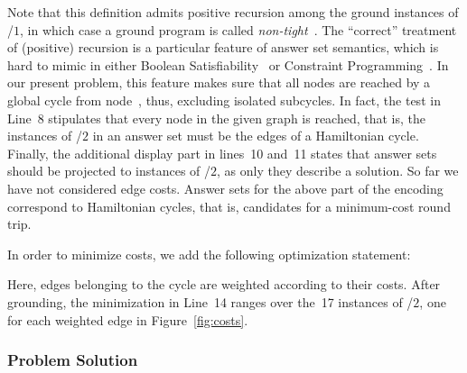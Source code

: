 Note that this definition admits positive recursion
among the ground instances of /$1$,
in which case a ground program is called \emph{non-tight}~\cite{erdlif03a,fages94a}.
The ``correct'' treatment of (positive) recursion 
is a particular feature of answer set semantics,
which is hard to mimic in either
Boolean Satisfiability~\cite{SATHandbook} or
Constraint Programming~\cite{CPHandbook}.
In our present problem, this feature makes sure that all nodes are reached
by a global cycle from node~, thus, excluding isolated subcycles.
In fact, the test in Line~8 stipulates that every node in the given graph
is reached, that is, the instances of /$2$ in an answer set
must be the edges of a Hamiltonian cycle.%
Finally, the additional display part in lines~10 and~11 states that answer
sets should be projected to instances of /$2$, as only they
describe a solution.
So far we have not considered edge costs.
Answer sets for the above part of the encoding correspond to Hamiltonian cycles,
that is, candidates for a minimum-cost round trip.

In order to minimize costs,
we add the following optimization statement:
%

%
Here, edges belonging to the cycle are weighted according to their costs.
After grounding, the minimization in Line~14 ranges over the~17 instances
of /$2$, one for each weighted edge in Figure~\ref{fig:costs}.

\subsubsection{Problem Solution}\label{subsec:tsp:solution}


